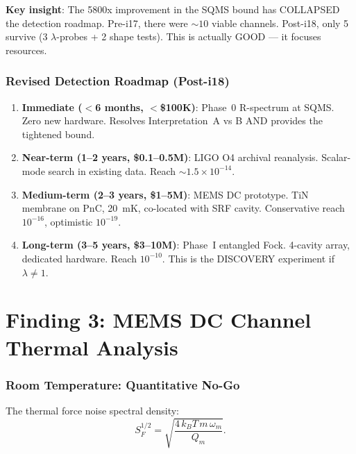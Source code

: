 \documentclass[11pt]{article}
\newcommand{\ee}[1]{\times 10^{#1}}
\theoremstyle{definition}
\theoremstyle{remark}
\begin{document}
\textbf{Key insight}: The 5800x improvement in the SQMS bound has
COLLAPSED the detection roadmap. Pre-i17, there were $\sim 10$ viable
channels. Post-i18, only 5 survive (3 $\lambda$-probes + 2 shape
tests). This is actually GOOD --- it focuses resources.

\section{Revised Detection Roadmap (Post-i18)}

\begin{enumerate}
\item \textbf{Immediate ($<$6 months, $<$\$100K)}: Phase~0 R-spectrum
  at SQMS. Zero new hardware. Resolves Interpretation~A vs B
  AND provides the tightened bound.

\item \textbf{Near-term (1--2 years, \$0.1--0.5M)}: LIGO O4 archival
  reanalysis. Scalar-mode search in existing data. Reach $\sim
  1.5\ee{-14}$.

\item \textbf{Medium-term (2--3 years, \$1--5M)}: MEMS DC prototype.
  TiN membrane on PnC, 20~mK, co-located with SRF cavity.
  Conservative reach $10^{-16}$, optimistic $10^{-19}$.

\item \textbf{Long-term (3--5 years, \$3--10M)}: Phase~I entangled
  Fock. 4-cavity array, dedicated hardware. Reach $10^{-10}$.
  This is the DISCOVERY experiment if $\lambda \neq 1$.
\end{enumerate}


\part{Finding 3: MEMS DC Channel Thermal Analysis}
\label{part:mems}


\section{Room Temperature: Quantitative No-Go}

The thermal force noise spectral density:
\begin{equation}
S_F^{1/2} = \sqrt{\frac{4\,k_B T\,m\,\omega_m}{Q_m}}.
\end{equation}
\end{document}
